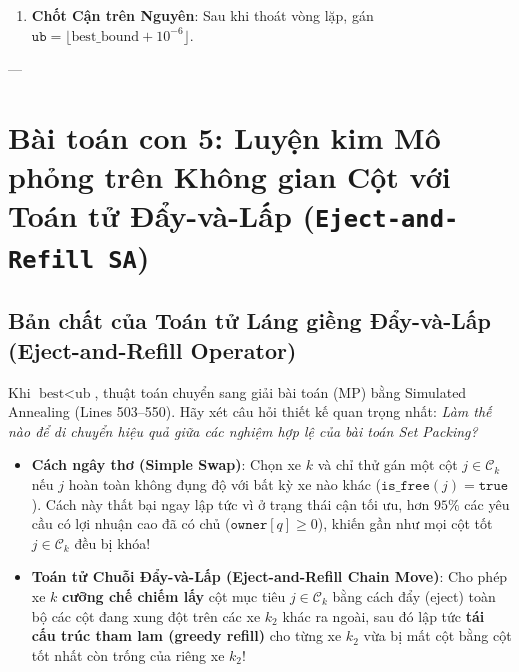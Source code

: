 \documentclass[11pt,a4paper]{article}
\theoremstyle{definition}
\begin{document}
\begin{enumerate}[leftmargin=1.5em]
\begin{itemize}[leftmargin=1.2em]
        \item Cập nhật nhân tử theo công thức Polyak:
        \begin{equation}
            \text{step}^{(t)} = \lambda \frac{L(u^{(t)}) - \text{best}}{\|\tilde{g}^{(t)}\|_2^2}, \qquad u_q^{(t+1)} = \max\Big(0.0, \; u_q^{(t)} - \text{step}^{(t)} \cdot \tilde{g}_q^{(t)}\Big).
        \end{equation}
    \end{itemize}
    \item \textbf{Chốt Cận trên Nguyên}: Sau khi thoát vòng lặp, gán $\texttt{ub} = \lfloor \text{best\_bound} + 10^{-6} \rfloor$.
\end{enumerate}

---

\section{Bài toán con 5: Luyện kim Mô phỏng trên Không gian Cột với Toán tử Đẩy-và-Lấp (\texttt{Eject-and-Refill SA})}

\subsection{Bản chất của Toán tử Láng giềng Đẩy-và-Lấp (Eject-and-Refill Operator)}
Khi $\text{best} < \text{ub}$, thuật toán chuyển sang giải bài toán (MP) bằng Simulated Annealing (Lines 503--550). Hãy xét câu hỏi thiết kế quan trọng nhất: \textit{Làm thế nào để di chuyển hiệu quả giữa các nghiệm hợp lệ của bài toán Set Packing?}

\begin{itemize}[leftmargin=1.5em]
    \item \textbf{Cách ngây thơ (Simple Swap)}: Chọn xe $k$ và chỉ thử gán một cột $j \in \mathcal{C}_k$ nếu $j$ hoàn toàn không đụng độ với bất kỳ xe nào khác ($\texttt{is\_free}(j) = \texttt{true}$). Cách này thất bại ngay lập tức vì ở trạng thái cận tối ưu, hơn $95\%$ các yêu cầu có lợi nhuận cao đã có chủ ($\texttt{owner}[q] \ge 0$), khiến gần như mọi cột tốt $j \in \mathcal{C}_k$ đều bị khóa!
    \item \textbf{Toán tử Chuỗi Đẩy-và-Lấp (Eject-and-Refill Chain Move)}: Cho phép xe $k$ \textbf{cưỡng chế chiếm lấy} cột mục tiêu $j \in \mathcal{C}_k$ bằng cách đẩy (eject) toàn bộ các cột đang xung đột trên các xe $k_2$ khác ra ngoài, sau đó lập tức \textbf{tái cấu trúc tham lam (greedy refill)} cho từng xe $k_2$ vừa bị mất cột bằng cột tốt nhất còn trống của riêng xe $k_2$!
\end{itemize}
\end{document}
